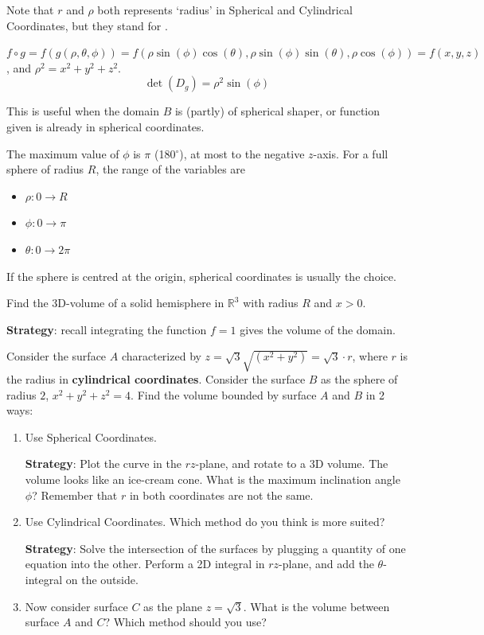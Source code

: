 Note that $r$ and $\rho$ both represents `radius' in Spherical and Cylindrical Coordinates, but they stand for . 

$f \circ g = f(g(\rho, \theta, \phi)) = f(\rho \sin(\phi) \cos(\theta), \rho \sin(\phi) \sin(\theta), \rho \cos(\phi)) = f(x, y, z)$, and $\rho^2 = x^2 + y^2 + z^2$. 
$$\det(D_g) = \rho^2 \sin(\phi)$$

This is useful when the domain $B$ is (partly) of spherical shaper, or function given is already in spherical coordinates. 

The maximum value of $\phi$ is $\pi$ (180$^\circ$), at most to the negative $z$-axis. For a full sphere of radius $R$, the range of the variables are 
\begin{itemize}
    \item $\rho: 0 \to R$
    \item $\phi: 0 \to \pi$
    \item $\theta: 0 \to 2\pi$
\end{itemize}

If the sphere is  centred at the origin, spherical coordinates is usually  the choice. 

\begin{exercise}
    Find the 3D-volume of a solid hemisphere in $\mathbb{R}^3$ with radius $R$ and $x > 0$. 

    \textbf{Strategy}: recall integrating the function $f = 1$ gives the volume of the domain. 
\end{exercise}

\begin{exercise}
    Consider the surface $A$ characterized by $z = \sqrt{3} \sqrt{(x^2 + y^2)} = \sqrt{3} \cdot r$, where $r$ is the radius in \textbf{cylindrical coordinates}. Consider the surface $B$ as the sphere of radius $2$, $x^2 + y^2 + z^2 = 4$. Find the volume bounded by surface $A$ and $B$ in 2 ways:

    \begin{enumerate}[label=\alph*)]
        \item Use Spherical Coordinates.
        
        \textbf{Strategy}: Plot the curve in the $rz$-plane, and rotate to a 3D volume. The volume looks like an ice-cream cone. What is the maximum inclination angle $\phi$? Remember that $r$ in both coordinates are not the same.

        \item Use Cylindrical Coordinates. Which method do you think is more suited?
        
        \textbf{Strategy}: Solve the intersection of the surfaces by plugging a quantity of one equation into the other. Perform a 2D integral in $rz$-plane, and add the $\theta$-integral on the outside.
        
        \item Now consider surface $C$ as the plane $z = \sqrt{3}$. What is the volume between surface $A$ and $C$? Which method should you use?
    \end{enumerate}
\end{exercise}

